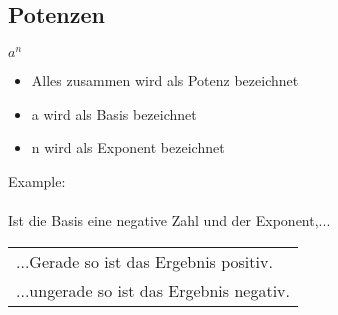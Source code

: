 \subsection{Potenzen}

\begin{huge}
    $a^n$
\end{huge}

\begin{itemize}
    \item Alles zusammen wird als Potenz bezeichnet
    \item a wird als Basis bezeichnet
    \item n wird als Exponent bezeichnet
\end{itemize}

\hfill \break
Example:\\
\fboxrule=0.8pt \\


\hfill \break
Ist die Basis eine negative Zahl und der Exponent,...\\
\begin{tabular}[t]{@{}l@{}}
    ...Gerade so ist das Ergebnis positiv. \\
    ...ungerade so ist das Ergebnis negativ.
\end{tabular}